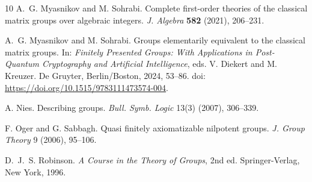 \documentclass{article}
\theoremstyle{remark}
\begin{document}
\begin{thebibliography}{10}
 A.~G. Myasnikov and M. Sohrabi. Complete first-order theories of the classical matrix groups over algebraic integers. \emph{J. Algebra} \textbf{582} (2021), 206--231.

 A.~G. Myasnikov and M. Sohrabi. Groups elementarily equivalent to the classical matrix groups. In: \emph{Finitely Presented Groups: With Applications in Post-Quantum Cryptography and Artificial Intelligence}, eds. V. Diekert and M. Kreuzer. De Gruyter, Berlin/Boston, 2024, 53--86. doi: \url{https://doi.org/10.1515/9783111473574-004}.

 A. Nies. Describing groups. \emph{Bull. Symb. Logic} 13(3) (2007), 306--339.

 F. Oger and G. Sabbagh. Quasi finitely axiomatizable nilpotent groups. \emph{J. Group Theory} 9 (2006), 95--106.

 D.~J.~S. Robinson. \emph{A Course in the Theory of Groups}, 2nd ed. Springer-Verlag, New York, 1996.


\end{thebibliography}
\end{document}
